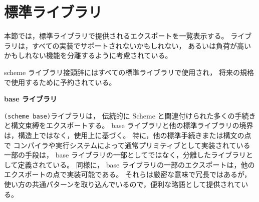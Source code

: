 \chapter{標準ライブラリ}
\label{stdlibraries}


本節では，標準ライブラリで提供されるエクスポートを一覧表示する。
ライブラリは，すべての実装でサポートされないかもしれない，
あるいは負荷が高いかもしれない機能を分離するように考慮されている。

{\cf scheme} ライブラリ接頭辞にはすべての標準ライブラリで使用され，
将来の規格で使用するために予約されている。

\textbf{base ライブラリ}

\texttt{(scheme base)}ライブラリは，
伝統的に Scheme と関連付けられた多くの手続きと構文束縛をエクスポートする。
base ライブラリと他の標準ライブラリの境界は，構造上ではなく，使用上に基づく。
特に，他の標準手続きまたは構文の点で
コンパイラや実行システムによって通常プリミティブとして実装されている一部の手段は，
base ライブラリの一部としてではなく，分離したライブラリとして定義されている。
同様に， base ライブラリの一部のエクスポートは，他のエクスポートの点で実装可能である。
それらは厳密な意味で冗長ではあるが，
使い方の共通パターンを取り込んでいるので，便利な略語として提供されている。


